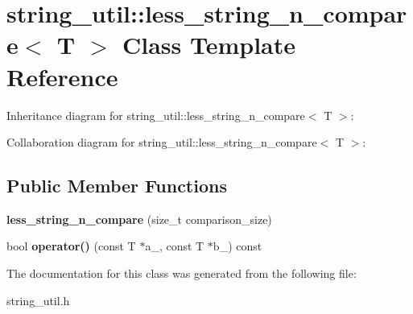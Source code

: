 \section{string\+\_\+util\+:\+:less\+\_\+string\+\_\+n\+\_\+compare$<$ T $>$ Class Template Reference}
\label{classstring__util_1_1less__string__n__compare}


Inheritance diagram for string\+\_\+util\+:\+:less\+\_\+string\+\_\+n\+\_\+compare$<$ T $>$\+:


Collaboration diagram for string\+\_\+util\+:\+:less\+\_\+string\+\_\+n\+\_\+compare$<$ T $>$\+:
\subsection*{Public Member Functions}
\begin{DoxyCompactItemize}
\item 
{\bfseries less\+\_\+string\+\_\+n\+\_\+compare} (size\+\_\+t comparison\+\_\+size)\label{classstring__util_1_1less__string__n__compare_a42b269c0aa27c5ace8b3eeb782f6d335}

\item 
bool {\bfseries operator()} (const T $\ast$a\+\_\+, const T $\ast$b\+\_\+) const \label{classstring__util_1_1less__string__n__compare_ab6f6bb1fbd6421cb848bba88ce18f6e0}

\end{DoxyCompactItemize}


The documentation for this class was generated from the following file\+:\begin{DoxyCompactItemize}
\item 
string\+\_\+util.\+h\end{DoxyCompactItemize}
